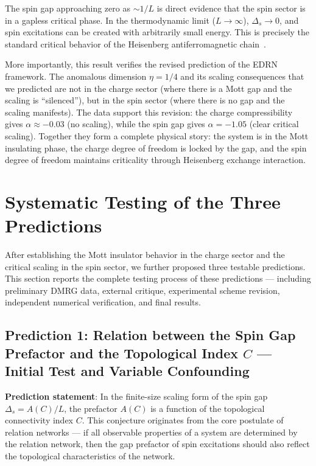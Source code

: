 \documentclass[prb,reprint,twocolumn,superscriptaddress]{revtex4-2}
\begin{document}
The spin gap approaching zero as $\sim 1/L$ is direct evidence that the spin sector is in a gapless critical phase. In the thermodynamic limit ($L \to \infty$), $\Delta_s \to 0$, and spin excitations can be created with arbitrarily small energy. This is precisely the standard critical behavior of the Heisenberg antiferromagnetic chain~\cite{Affleck1989,Giamarchi2004,Schulz1990}.

More importantly, this result verifies the revised prediction of the EDRN framework. The anomalous dimension $\eta = 1/4$ and its scaling consequences that we predicted are not in the charge sector (where there is a Mott gap and the scaling is ``silenced''), but in the spin sector (where there is no gap and the scaling manifests). The data support this revision: the charge compressibility gives $\alpha \approx -0.03$ (no scaling), while the spin gap gives $\alpha = -1.05$ (clear critical scaling). Together they form a complete physical story: the system is in the Mott insulating phase, the charge degree of freedom is locked by the gap, and the spin degree of freedom maintains criticality through Heisenberg exchange interaction.

\section{Systematic Testing of the Three Predictions}\label{sec:predictions}

After establishing the Mott insulator behavior in the charge sector and the critical scaling in the spin sector, we further proposed three testable predictions. This section reports the complete testing process of these predictions --- including preliminary DMRG data, external critique, experimental scheme revision, independent numerical verification, and final results.

\subsection{Prediction 1: Relation between the Spin Gap Prefactor and the Topological Index $C$ --- Initial Test and Variable Confounding}

\textbf{Prediction statement}: In the finite-size scaling form of the spin gap $\Delta_s = A(C)/L$, the prefactor $A(C)$ is a function of the topological connectivity index $C$. This conjecture originates from the core postulate of relation networks --- if all observable properties of a system are determined by the relation network, then the gap prefactor of spin excitations should also reflect the topological characteristics of the network.
\end{document}

